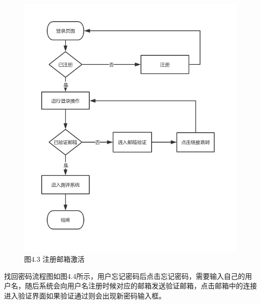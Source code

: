 \begin{figure}[thbp!]
	\centering
	\includegraphics[width=1.0\linewidth]{figure/register_email}
	\label{fig:register_email} \\
		图4.3 注册邮箱激活
\end{figure}

找回密码流程图如图4.4所示，用户忘记密码后点击忘记密码，需要输入自己的用户名，随后系统会向用户名注册时候对应的邮箱发送验证邮箱，点击邮箱中的连接进入验证界面如果验证通过则会出现新密码输入框。

